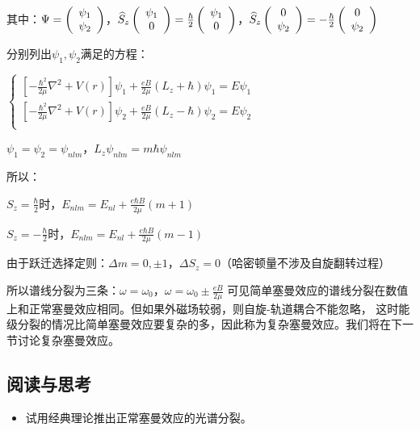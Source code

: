 其中：$\Psi  = \left( {\begin{array}{*{20}c}
   {\psi _1 }  \\
   {\psi _2 }  \\
\end{array}} \right)$，$\widehat S_z \left( {\begin{array}{*{20}c}
   {\psi _1 }  \\
   0  \\
\end{array}} \right) = \frac{\hbar }{2}\left( {\begin{array}{*{20}c}
   {\psi _1 }  \\
   0  \\
\end{array}} \right)$，$\widehat S_z \left( {\begin{array}{*{20}c}
   0  \\
   {\psi _2 }  \\
\end{array}} \right) =  - \frac{\hbar }{2}\left( {\begin{array}{*{20}c}
   0  \\
   {\psi _2 }  \\
\end{array}} \right)$

分别列出$\psi _1 ,\psi _2 $满足的方程：

$\left\{ \begin{array}{l}
 \left[ { - \frac{{\hbar ^2 }}{{2\mu }}\nabla ^2  + V(r)} \right]\psi _1  + \frac{{eB}}{{2\mu }}\left( {L_z  + \hbar } \right)\psi _1  = E\psi _1  \\
 \left[ { - \frac{{\hbar ^2 }}{{2\mu }}\nabla ^2  + V(r)} \right]\psi _2  + \frac{{eB}}{{2\mu }}\left( {L_z  - \hbar } \right)\psi _2  = E\psi _2  \\
 \end{array} \right.$

$\psi _1  = \psi _2  = \psi _{nlm} $，$L_z \psi _{nlm}  = m\hbar \psi _{nlm} $

所以：

$S_z  = \frac{\hbar }{2}$时，$E_{nlm}  = E_{nl}  + \frac{{e\hbar B}}{{2\mu }}\left( {m + 1} \right)$


$S_z  =  - \frac{\hbar }{2}$时，$E_{nlm}  = E_{nl}  + \frac{{e\hbar B}}{{2\mu }}\left( {m - 1} \right)$


由于跃迁选择定则：$\Delta m = 0, \pm 1$，$\Delta S_z  = 0$（哈密顿量不涉及自旋翻转过程）

所以谱线分裂为三条：$\omega  = \omega _0 $，$\omega  = \omega _0  \pm \frac{{eB}}{{2\mu }}$
可见简单塞曼效应的谱线分裂在数值上和正常塞曼效应相同。但如果外磁场较弱，则自旋-轨道耦合不能忽略，
这时能级分裂的情况比简单塞曼效应要复杂的多，因此称为复杂塞曼效应。我们将在下一节讨论复杂塞曼效应。

\subsection*{阅读与思考}

\begin{itemize}

\item 试用经典理论推出正常塞曼效应的光谱分裂。

\end{itemize}
